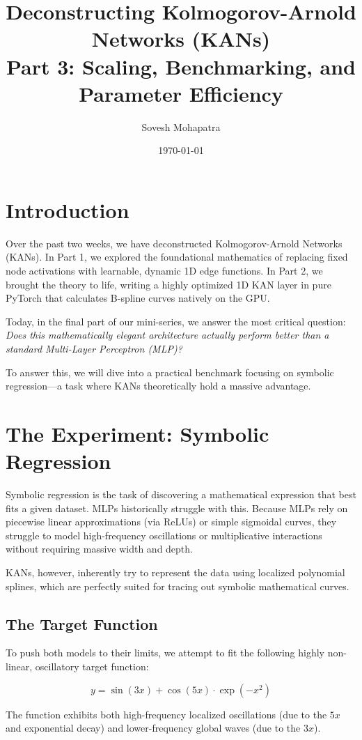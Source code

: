 \documentclass[12pt]{article}
\title{\textbf{Deconstructing Kolmogorov-Arnold Networks (KANs) \\ Part 3: Scaling, Benchmarking, and Parameter Efficiency}}
\author{Sovesh Mohapatra}
\date{\today}
\begin{document}
\maketitle

\section*{Introduction}
Over the past two weeks, we have deconstructed Kolmogorov-Arnold Networks (KANs). In Part 1, we explored the foundational mathematics of replacing fixed node activations with learnable, dynamic 1D edge functions. In Part 2, we brought the theory to life, writing a highly optimized 1D KAN layer in pure PyTorch that calculates B-spline curves natively on the GPU.

Today, in the final part of our mini-series, we answer the most critical question: \textit{Does this mathematically elegant architecture actually perform better than a standard Multi-Layer Perceptron (MLP)?} 

To answer this, we will dive into a practical benchmark focusing on symbolic regression—a task where KANs theoretically hold a massive advantage.

\section*{The Experiment: Symbolic Regression}
Symbolic regression is the task of discovering a mathematical expression that best fits a given dataset. MLPs historically struggle with this. Because MLPs rely on piecewise linear approximations (via ReLUs) or simple sigmoidal curves, they struggle to model high-frequency oscillations or multiplicative interactions without requiring massive width and depth.

KANs, however, inherently try to represent the data using localized polynomial splines, which are perfectly suited for tracing out symbolic mathematical curves.

\subsection*{The Target Function}
To push both models to their limits, we attempt to fit the following highly non-linear, oscillatory target function:

\begin{equation}
y = \sin(3x) + \cos(5x) \cdot \exp(-x^2)
\end{equation}

The function exhibits both high-frequency localized oscillations (due to the $5x$ and exponential decay) and lower-frequency global waves (due to the $3x$).
\end{document}
